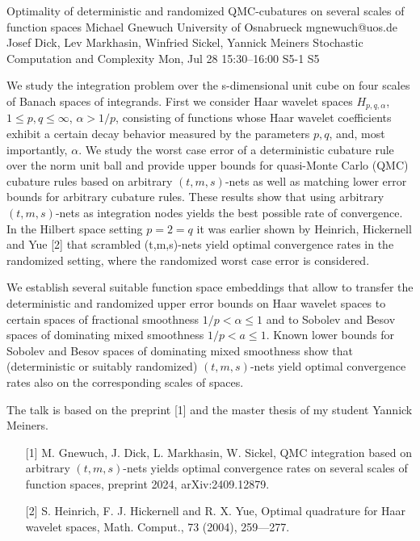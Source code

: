 \begin{talk}
  {Optimality of deterministic and randomized QMC-cubatures on several scales of function spaces}%
  {Michael Gnewuch}%
  {University of Osnabrueck}%
  {mgnewuch@uos.de}%
  {Josef Dick, Lev Markhasin, Winfried Sickel, Yannick Meiners}%
  {Stochastic Computation and Complexity}%
  {Mon, Jul 28 15:30–16:00}%
  {S5-1}%
  {S5}%
				
			
			
We study the integration problem over the s-dimensional unit cube on four scales of Banach spaces of integrands. First we consider Haar wavelet spaces $H_{p, q, \alpha}$, $1\le p, q \le \infty$, $\alpha > 1/p$, consisting of functions whose Haar wavelet coefficients exhibit a certain decay behavior measured by the parameters $p,q$, and, most importantly, $\alpha$.  We study the worst case error of a deterministic cubature rule over the norm unit ball 
and provide upper bounds for quasi-Monte Carlo (QMC) cubature rules based on arbitrary $(t,m,s)$-nets as well as matching lower error bounds for arbitrary cubature rules. These results show that using arbitrary $(t,m,s)$-nets as integration nodes yields the best possible rate of convergence. In the Hilbert space setting $p=2 = q$ it was earlier shown by Heinrich, Hickernell and Yue [2]  that scrambled (t,m,s)-nets yield optimal convergence rates in the randomized setting, where the randomized worst case error is considered. 

We establish several suitable function space embeddings that allow to transfer the deterministic and randomized upper error bounds on Haar wavelet spaces
to certain spaces of fractional smoothness $1/p < \alpha  \le 1$ and to Sobolev and Besov spaces of dominating mixed smoothness $1/p < a \le 1$.
Known lower bounds for Sobolev and Besov spaces of dominating mixed smoothness show that (deterministic or suitably randomized) $(t,m,s)$-nets yield optimal convergence rates also on the corresponding scales of spaces.			

The talk is based on the preprint [1] and the master thesis of my student Yannick Meiners.
\medskip

\begin{enumerate}
	\item[{[1]}] M. Gnewuch, J. Dick, L. Markhasin, W. Sickel, QMC integration based on arbitrary $(t,m,s)$-nets yields optimal convergence rates on several scales of function spaces, preprint 2024, arXiv:2409.12879. 
        \item[{[2]}] S. Heinrich, F. J. Hickernell and R. X. Yue, Optimal quadrature for Haar wavelet spaces, Math. Comput., 73 (2004), 259---277.
	\end{enumerate}
\end{talk}

